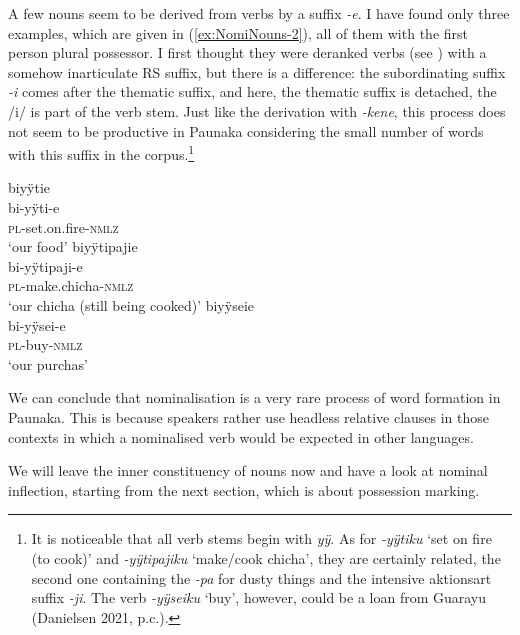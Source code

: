 A few nouns seem to be derived from verbs by a suffix \textit{-e}. I have found only three examples, which are given in (\ref{ex:NomiNouns-2}), all of them with the first person plural possessor. I first thought they were deranked verbs (see ) with a somehow inarticulate RS suffix, but there is a difference: the subordinating suffix \textit{-i} comes after the thematic suffix, and here, the thematic suffix is detached, the /i/ is part of the verb stem. Just like the derivation with \textit{-kene}, this process does not seem to be productive in Paunaka considering the small number of words with this suffix in the corpus.\footnote{It is noticeable that all verb stems begin with \textit{yÿ}. As for \textit{-yÿtiku} ‘set on fire (to cook)’ and \mbox{\textit{-yÿtipajiku}} ‘make/cook chicha’, they are certainly related, the second one containing the  \textit{-pa} for dusty things and the intensive aktionsart suffix \textit{-ji}. The verb \textit{-yÿseiku} ‘buy’, however, could be a loan from Guarayu (Danielsen 2021, p.c.).} 


\ea\label{ex:NomiNouns-2}
  \ea\label{ex:NomiNouns-2.1}
\begingl
\glpreamble biyÿtie\\
\gla bi-yÿti-e\\
\textsc{pl}-set.on.fire-\textsc{nmlz}\\
\glft ‘our food’
\endgl
  \ex\label{ex:NomiNouns-2.2}
\begingl
\glpreamble biyÿtipajie\\
\gla bi-yÿtipaji-e\\
\textsc{pl}-make.chicha-\textsc{nmlz}\\
\glft ‘our chicha (still being cooked)’
\endgl
  \ex\label{ex:NomiNouns-2.3}
\begingl
\glpreamble biyÿseie\\
\gla bi-yÿsei-e\\
\textsc{pl}-buy-\textsc{nmlz}\\
\glft ‘our purchas’
\endgl
\z
\xe

We can conclude that nominalisation is a very rare process of word formation in Paunaka. This is because speakers rather use headless relative clauses in those contexts in which a nominalised verb would be expected in other languages.

We will leave the inner constituency of nouns now and have a look at nominal inflection, starting from the next section, which is about possession marking.




